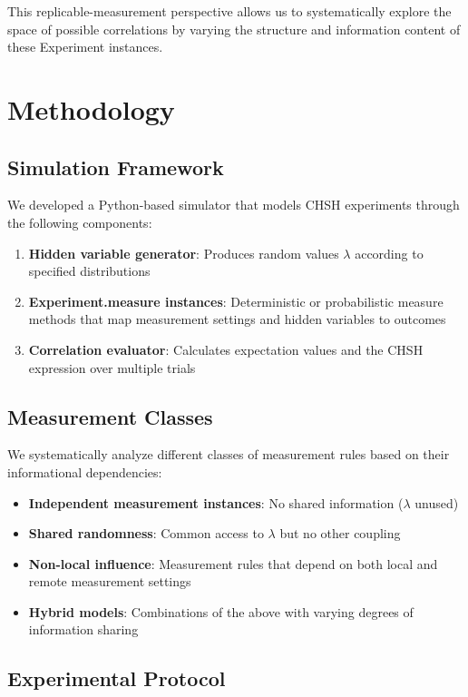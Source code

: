 \documentclass[11pt,a4paper]{article}
\begin{document}
This replicable-measurement perspective allows us to systematically explore the space of possible correlations by varying the structure and information content of these Experiment instances.

\section{Methodology}

\subsection{Simulation Framework}

We developed a Python-based simulator that models CHSH experiments through the following components:

\begin{enumerate}
\item \textbf{Hidden variable generator}: Produces random values $\lambda$ according to specified distributions
\item \textbf{Experiment.measure instances}: Deterministic or probabilistic measure methods that map measurement settings and hidden variables to outcomes
\item \textbf{Correlation evaluator}: Calculates expectation values and the CHSH expression over multiple trials
\end{enumerate}

\subsection{Measurement Classes}

We systematically analyze different classes of measurement rules based on their informational dependencies:

\begin{itemize}
\item \textbf{Independent measurement instances}: No shared information ($\lambda$ unused)
\item \textbf{Shared randomness}: Common access to $\lambda$ but no other coupling
\item \textbf{Non-local influence}: Measurement rules that depend on both local and remote measurement settings
\item \textbf{Hybrid models}: Combinations of the above with varying degrees of information sharing
\end{itemize}

\subsection{Experimental Protocol}
\end{document}
